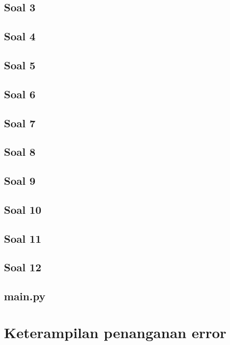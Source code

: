 \documentclass[a4paper,12pt]{report}
\begin{document}
\section*{Soal 3}

\section*{Soal 4}

\section*{Soal 5}

\section*{Soal 6}

\section*{Soal 7}

\section*{Soal 8}

\section*{Soal 9}

\section*{Soal 10}

\section*{Soal 11}

\section*{Soal 12}

\section*{main.py}


\chapter{Keterampilan penanganan error}
\end{document}
